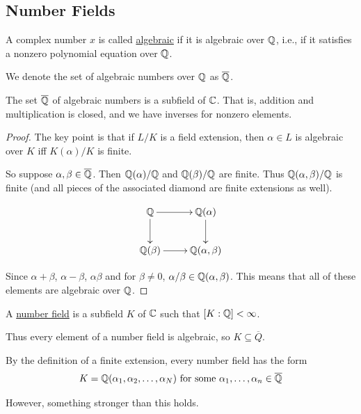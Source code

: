 \subsection{Number Fields}
\begin{definition}
    A complex number $x$ is called \ul{algebraic} if it is algebraic over $\mathbb Q$, i.e., if it satisfies a nonzero polynomial equation over $\mathbb Q$.

    We denote the set of algebraic numbers over $\mathbb Q$ as $\overline{\mathbb Q}$.
\end{definition}
\begin{proposition}
    The set $\overline{\mathbb Q}$ of algebraic numbers is a subfield of $\mathbb C$. That is, addition and multiplication is closed, and we have inverses for nonzero elements.
\end{proposition}
\begin{proof}
    The key point is that if $L / K$ is a field extension, then $\alpha\in L$ is algebraic over $K$ iff $K(\alpha)/K$ is finite.

    So suppose $\alpha, \beta\in\overline{\mathbb Q}$. Then $\mathbb Q(\alpha)/\mathbb Q$ and $\mathbb Q(\beta)/\mathbb Q$ are finite. Thus $\mathbb Q(\alpha, \beta)/\mathbb Q$ is finite (and all pieces of the associated diamond are finite extensions as well).

    \[
        \xymatrix{
            \QQ \ar[d] \ar[r] &\QQ(\alpha)\ar[d]\\
            \QQ(\beta) \ar[r] &\QQ(\alpha, \beta)}
    \]


    Since $\alpha + \beta$, $\alpha - \beta$, $\alpha\beta$ and for $\beta \neq 0$, $\alpha/\beta \in \mathbb Q(\alpha, \beta)$. This means that all of these elements are algebraic over $\mathbb Q$.
\end{proof}

\begin{definition}
    A \ul{number field} is a subfield $K$ of $\mathbb C$ such that $[K : \mathbb Q] < \infty$.
\end{definition}

Thus every element of a number field is algebraic, so $K\subseteq \overline{Q}$.

By the definition of a finite extension, every number field has the form
\[K = \mathbb Q(\alpha_1, \alpha_2, \dots, \alpha_N)\text{ for some }\alpha_1, \dots, \alpha_n\in\overline{\mathbb Q}\]

However, something stronger than this holds.

